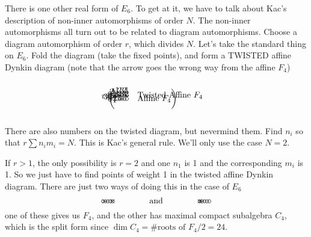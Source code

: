 \begin{example}
   There is one other real form of $E_6$. To get at it, we have to talk about Kac's
   description of non-inner automorphisms of order $N$. The non-inner automorphisms
   all turn out to be related to diagram automorphisms. Choose a diagram automorphism
   of order $r$, which divides $N$. Let's take the standard thing on $E_6$. Fold the
   diagram (take the fixed points), and form a TWISTED affine Dynkin diagram (note
   that the arrow goes the wrong way from the affine $F_4$)
   \[
      \begin{xy}
      (0,-1.4)="1" *+!L{1} *\cir<2pt>{};
      p+(0,.7)="2" *+!L{2} *\cir<2pt>{} **@{-};
      p+(0,.7)="y" *+!R{3} *\cir<2pt>{} **@{-};
          p+(.7,0) *+!D{2} *\cir<2pt>{} **@{-};
          p+(.7,0) *+!D{1} *\cir<2pt>{} **@{-};
      "y" *=<4pt,4pt>{};p+(0,.7)="22" *+!L{2} *\cir<2pt>{} **@{-};
      p+(0,.7)="11" *+!L{1} *\cir<2pt>{} **@{-};
       "1" *+{\ };"11" *+{\ } **\crv{"y"+(-1.6,0)} ?<*@{<} ?>*@{>} ?(.5)*+!R{r},
       "2" *+{\ };"22" *+{\ } **\crv{"y"+(-1.2,0)} ?<*@{<} ?>*@{>},
      (3,.5) *+!D{1} *\cir<2pt>{};
      p+(1,0) *+!D{2} *\cir<2pt>{} **@{-};
      p+(1,0)="x" *+!D{3} *\cir<2pt>{} **@{=} ?*@{>};
      "x" *{\hspace{4pt}};p+(1,0) *+!D{2} *\cir<2pt>{} **@{-};
      p+(1,0) *+!D{1} *\cir<2pt>{} *+<2.5em>!L{\text{Twisted Affine }F_4} **@{-};
      (3,-1) *+!D{1} *+!R{\biggr(} *\cir<2pt>{};
      p+(1,0) *+!D{2} *\cir<2pt>{} **@{-};
      p+(1,0) *+!D{3} *\cir<2pt>{} **@{-};
      p+(1,0)="x" *+!D{4} *\cir<2pt>{} **@{=} ?*@{>};
      "x" *{\hspace{4pt}};p+(1,0) *+!D{2} *+<2.5em>!L{\text{Affine }F_4 \biggr)} *\cir<2pt>{} **@{-};
      \ar (1.7,.1);(2.5,.3)
     \end{xy}
   \]
   There are also numbers on the twisted diagram, but nevermind them. Find $n_i$ so
   that $r\sum n_i m_i=N$. This is Kac's general rule. We'll only use the case $N=2$.

   If $r>1$, the only possibility is $r=2$ and one $n_1$ is 1 and the corresponding
   $m_i$ is 1. So we just have to find points of weight 1 in the twisted affine Dynkin
   diagram. There are just two ways of doing this in the case of $E_6$
   \[
    \begin{xy}
      (0,0) *\cir<2pt>{};
      p+(1,0) *\cir<2pt>{} **@{-};
      p+(1,0)="x" *\cir<2pt>{} **@{=} ?*@{>};
      "x" *{\hspace{4pt}};p+(1,0) *\cir<2pt>{} **@{-};
      p+(1,0) *{\times} *\cir<2pt>{} **@{-};
    \end{xy}\qquad\qquad \text{and} \qquad\qquad
    \begin{xy}
      (0,0) *{\times} *\cir<2pt>{};
      p+(1,0) *\cir<2pt>{} **@{-};
      p+(1,0)="x" *\cir<2pt>{} **@{=} ?*@{>};
      "x" *{\hspace{4pt}};p+(1,0) *\cir<2pt>{} **@{-};
      p+(1,0) *\cir<2pt>{} **@{-};
    \end{xy}
   \]
   one of these gives us $F_4$, and the other has maximal compact subalgebra $C_4$,
   which is the split form since $\dim C_4=\#\text{roots of }F_4/2 =24$.
 \end{example}

